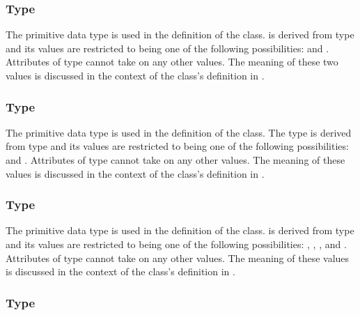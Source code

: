 \subsubsection{Type \fixttspace{}}
\label{primtype-diffusionkind}

The  primitive data type is used in the definition of the \DiffusionCoefficient class.   is derived from type  and its values are restricted to being one of the following possibilities:  and .  Attributes of type  cannot take on any other values.  The meaning of these two values is discussed in the context of the \DiffusionCoefficient class's definition in .


\subsubsection{Type \fixttspace{}}
\label{primtype-functionkind}

The  primitive data type is used in the definition of the \AnalyticVolume class.  The type  is derived from type  and its values are restricted to being one of the following possibilities:  and .  Attributes of type  cannot take on any other values.  The meaning of these values is discussed in the context of the \AnalyticVolume class's definition in .


\subsubsection{Type \fixttspace{}}
\label{primtype-geometrykind}

The  primitive data type is used in the definition of the \Geometry class.   is derived from type  and its values are restricted to being one of the following possibilities: , , , and .  Attributes of type  cannot take on any other values.  The meaning of these values is discussed in the context of the \Geometry class's definition in .


\subsubsection{Type \fixttspace{}}
\label{primtype-setoperation}

